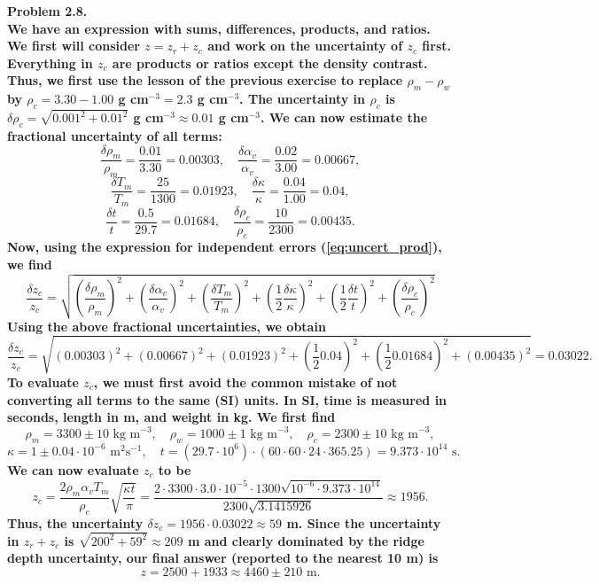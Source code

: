 \noindent
\bf{Problem 2.8.} \\

We have an expression with sums, differences, products, and ratios.  We first
will consider $z = z_r + z_c$ and work on the uncertainty of $z_c$ first.  Everything
in $z_c$ are products or ratios except the density contrast.  Thus, we first use the lesson
of the previous exercise to replace $\rho_m - \rho_w$ by $\rho_c = 3.30 - 1.00$ g cm$^{-3} = 2.3$
g cm$^{-3}$.  The uncertainty in $ \rho_c$ is
$\delta \rho_c = \sqrt{0.001^2 + 0.01^2}$ g cm$^{-3} \approx 0.01$ g cm$^{-3}$.  We can now estimate the
fractional uncertainty of all terms:
\[
\frac{\delta \rho_m}{\rho_m} = \frac{0.01}{3.30} = 0.00303, \quad \frac{\delta \alpha_v}{\alpha_v} = \frac{0.02}{3.00} = 0.00667,
\]
\[
\frac{\delta T_m}{T_m} = \frac{25}{1300} = 0.01923, \quad \frac{\delta \kappa}{\kappa} = \frac{0.04}{1.00} = 0.04,
\]
\[
\frac{\delta t}{t} = \frac{0.5}{29.7} = 0.01684, \quad \frac{\delta \rho_c}{\rho_c} = \frac{10}{2300} = 0.00435.
\]
Now, using the expression for independent errors (\ref{eq:uncert_prod}), we find
\[
\frac{\delta z_c}{z_c} = \sqrt{\left(\frac{\delta \rho_m}{\rho_m}\right)^2 + \left(\frac{\delta \alpha_v}{\alpha_v}\right)^2 +
\left(\frac{\delta T_m}{T_m}\right)^2 + \left(\frac{1}{2} \frac{\delta \kappa}{\kappa}\right)^2 + \left(\frac{1}{2} \frac{\delta t}{t}\right)^2
+ \left(\frac{\delta \rho_c}{\rho_c}\right)^2}
\]
Using the above fractional uncertainties, we obtain
\[
\frac{\delta z_c}{z_c} = \sqrt{\left(0.00303\right)^2 + \left(0.00667\right)^2 +
\left(0.01923\right)^2 + \left(\frac{1}{2} 0.04\right)^2 + \left(\frac{1}{2} 0.01684\right)^2
+ \left(0.00435\right)^2} = 0.03022.
\]
To evaluate $z_c$, we must first avoid the common mistake of not converting all terms to the same (SI) units.
In SI, time is measured in seconds, length in m, and weight in kg.  We first find
\[
\rho_m = 3300 \pm 10 \mbox{ kg m}^{-3}, \quad \rho_w = 1000 \pm 1 \mbox{ kg m}^{-3}, \quad \rho_c = 2300 \pm 10 \mbox{ kg m}^{-3},
\]
\[
\kappa = 1 \pm 0.04 \cdot 10^{-6} \mbox{ m}^2\mbox{s}^{-1}, \quad t = (29.7\cdot10^6)\cdot(60\cdot60\cdot24\cdot365.25) = 9.373\cdot10^{14}\mbox{ s}.
\]
We can now evaluate $z_c$ to be
\[
z_c = \frac{2 \rho_m \alpha_v T_m}{\rho_c} \sqrt{\frac{\kappa t}{\pi}} =
\frac{2 \cdot 3300 \cdot 3.0\cdot 10^{-5} \cdot 1300 \sqrt{10^{-6} \cdot 9.373\cdot10^{14}}}{2300 \sqrt{3.1415926}} \approx 1956.
\]
Thus, the uncertainty $\delta z_c = 1956 \cdot 0.03022 \approx 59$ m.  Since the uncertainty in $z_r + z_c$
is $\sqrt{200^2 + 59^2} \approx 209$ m and clearly dominated by the ridge depth uncertainty,
our final answer (reported to the nearest 10 m) is
\[
z = 2500 + 1933 \approx 4460 \pm 210 \mbox{ m}.
\]

